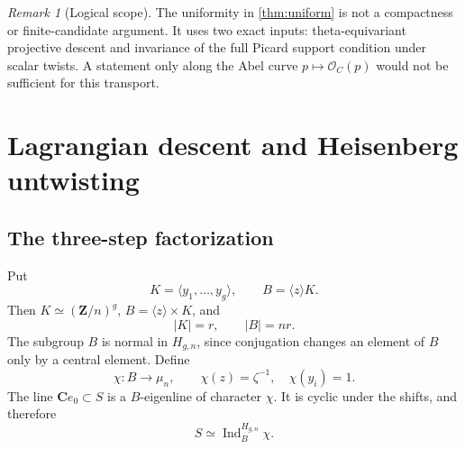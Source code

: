 \documentclass[11pt,reqno]{amsart}
\numberwithin{equation}{section}
\theoremstyle{remark}
\newtheorem{remark}[remark]{Remark}
\DeclareMathOperator{\Ind}{Ind}
\newcommand{\cO}{\mathcal O}
\newcommand{\bC}{\mathbf C}
\newcommand{\bZ}{\mathbf Z}
\begin{document}
\begin{remark}[Logical scope]\label{rem:scope-uniform}
The uniformity in \cref{thm:uniform} is not a compactness or
finite-candidate argument.  It uses two exact inputs:
theta-equivariant projective descent and invariance of the full Picard
support condition under scalar twists.  A statement only along the Abel
curve \(p\mapsto\cO_C(p)\) would not be sufficient for this transport.
\end{remark}

\section{Lagrangian descent and Heisenberg untwisting}

\subsection{The three-step factorization}

Put
\[
 K=\langle y_1,\ldots,y_g\rangle,\qquad
 B=\langle z\rangle K.
\tag{4.1}\label{eq:lagrangian-subgroups}
\]
Then \(K\simeq(\bZ/n)^g\), \(B=\langle z\rangle\times K\), and
\[
 |K|=r,\qquad |B|=nr.
\tag{4.2}\label{eq:BK-orders}
\]
The subgroup \(B\) is normal in \(H_{g,n}\), since conjugation changes
an element of \(B\) only by a central element.  Define
\[
 \chi\colon B\longrightarrow\mu_n,\qquad
 \chi(z)=\zeta^{-1},\quad \chi(y_i)=1.
\tag{4.3}\label{eq:chi}
\]
The line \(\bC e_0\subset S\) is a \(B\)-eigenline of character \(\chi\).
It is cyclic under the shifts, and therefore
\[
 S\simeq\Ind_B^{H_{g,n}}\chi.
\tag{4.4}\label{eq:monomial-schrodinger}
\]
\end{document}
